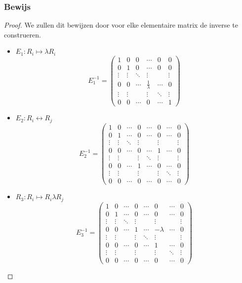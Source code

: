 \documentclass[lineaire_algebra_oplossingen.tex]{subfiles}
\begin{document}
\subsubsection*{Bewijs}
\begin{proof}
We zullen dit bewijzen door voor elke elementaire matrix de inverse te construeren.
\begin{itemize}
\item $E_1: R_i\mapsto \lambda R_i$
\[
E_1^{-1}=
\begin{pmatrix}
1 & 0 & 0 & \cdots & 0 & 0\\
0 & 1 & 0 & \cdots & 0 & 0\\
\vdots & \vdots & \ddots & \vdots& & \vdots\\
0 & 0 & \cdots & \frac{1}{\lambda} & \cdots & 0\\
\vdots & \vdots & & \vdots& \ddots & \vdots\\
0 & 0 & \cdots & 0 & \cdots &1
\end{pmatrix}
\]

\item $E_2: R_i \leftrightarrow R_j$
\[
E_2^{-1}=
\begin{pmatrix}
1 & 0 & \cdots & 0 & \cdots & 0 & \cdots & 0\\
0 & 1 & \cdots & 0 & \cdots & 0 & \cdots & 0\\
\vdots & \vdots & \ddots & \vdots& & \vdots & &\vdots\\
0 & 0 & \cdots & 0 & \cdots & 1 & \cdots & 0\\
\vdots & \vdots & & \vdots& \ddots & \vdots & &\vdots\\
0 & 0 & \cdots & 1 & \cdots & 0 & \cdots & 0\\
\vdots & \vdots & & \vdots & & \vdots & \ddots & \vdots\\
0 & 0 & \cdots & 0 & \cdots & 0 & \cdots & 0
\end{pmatrix}
\]
\item $R_3: R_i \mapsto R_i \lambda R_j$
\[
E_3^{-1}=
\begin{pmatrix}
1 & 0 & \cdots & 0 & \cdots & 0 & \cdots & 0\\
0 & 1 & \cdots & 0 & \cdots & 0 & \cdots & 0\\
\vdots & \vdots & \ddots & \vdots& & \vdots & &\vdots\\
0 & 0 & \cdots & 1 & \cdots & -\lambda & \cdots & 0\\
\vdots & \vdots & & \vdots& \ddots & \vdots & &\vdots\\
0 & 0 & \cdots & 0 & \cdots & 1 & \cdots & 0\\
\vdots & \vdots & & \vdots & & \vdots & \ddots & \vdots\\
0 & 0 & \cdots & 0 & \cdots & 0 & \cdots & 0
\end{pmatrix}
\]
\end{itemize}
\end{proof}
\end{document}
